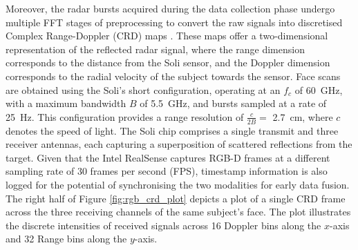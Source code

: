 \documentclass{mpaper}
\begin{document}
Moreover, the radar bursts acquired during the data collection phase undergo multiple FFT stages of preprocessing to convert the raw signals into discretised Complex Range-Doppler (CRD) maps \cite{lien2016soli,hayashi2021radarnet}. These maps offer a two-dimensional representation of the reflected radar signal, where the range dimension corresponds to the distance from the Soli sensor, and the Doppler dimension corresponds to the radial velocity of the subject towards the sensor. Face scans are obtained using the Soli's short configuration, operating at an $f_c$ of \qty{60}{\GHz}, with a maximum bandwidth $B$ of \qty{5.5}{\GHz}, and bursts sampled at a rate of \qty{25}{\Hz}. This configuration provides a range resolution of $\frac{c}{2B} = $ \qty{2.7}{\cm}, where $c$ denotes the speed of light. The Soli chip comprises a single transmit and three receiver antennas, each capturing a superposition of scattered reflections from the target. Given that the Intel RealSense captures RGB-D frames at a different sampling rate of 30 frames per second (FPS), timestamp information is also logged for the potential of synchronising the two modalities for early data fusion. The right half of Figure \ref{fig:rgb_crd_plot} depicts a plot of a single CRD frame across the three receiving channels of the same subject's face. The plot illustrates the discrete intensities of received signals across 16 Doppler bins along the $x$-axis and 32 Range bins along the $y$-axis.
\end{document}
